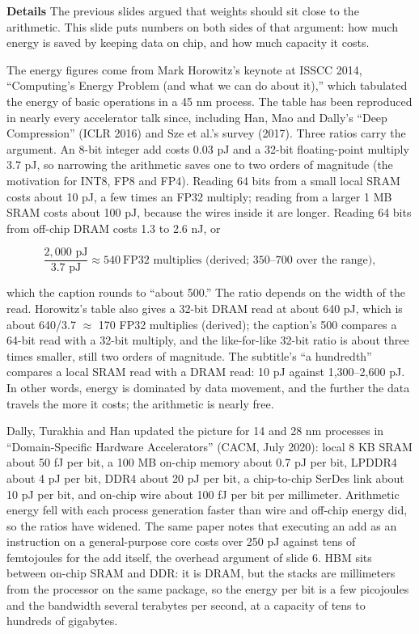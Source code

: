 \documentclass[11pt,letterpaper]{article}
\newcommand{\para}[1]{\medskip\noindent\textbf{#1}\quad}
\newenvironment{formulas}{\begin{tcolorbox}[formulabox]}{\end{tcolorbox}}
\begin{document}
\para{Details} The previous slides argued that weights should sit close to the arithmetic. This slide puts numbers on both sides of that argument: how much energy is saved by keeping data on chip, and how much capacity it costs.

The energy figures come from Mark Horowitz's keynote at ISSCC 2014, ``Computing's Energy Problem (and what we can do about it),'' which tabulated the energy of basic operations in a 45 nm process. The table has been reproduced in nearly every accelerator talk since, including Han, Mao and Dally's ``Deep Compression'' (ICLR 2016) and Sze et al.'s survey (2017). Three ratios carry the argument. An 8-bit integer add costs 0.03 pJ and a 32-bit floating-point multiply 3.7 pJ, so narrowing the arithmetic saves one to two orders of magnitude (the motivation for INT8, FP8 and FP4). Reading 64 bits from a small local SRAM costs about 10 pJ, a few times an FP32 multiply; reading from a larger 1 MB SRAM costs about 100 pJ, because the wires inside it are longer. Reading 64 bits from off-chip DRAM costs 1.3 to 2.6 nJ, or
\begin{formulas}
\[ \frac{2{,}000 \text{ pJ}}{3.7 \text{ pJ}} \approx 540 \ \text{FP32 multiplies (derived; } 350\text{--}700 \text{ over the range)}, \]
\end{formulas}
which the caption rounds to ``about 500.'' The ratio depends on the width of the read. Horowitz's table also gives a 32-bit DRAM read at about 640 pJ, which is about 640/3.7 $\approx$ 170 FP32 multiplies (derived); the caption's 500 compares a 64-bit read with a 32-bit multiply, and the like-for-like 32-bit ratio is about three times smaller, still two orders of magnitude. The subtitle's ``a hundredth'' compares a local SRAM read with a DRAM read: 10 pJ against 1{,}300--2{,}600 pJ. In other words, energy is dominated by data movement, and the further the data travels the more it costs; the arithmetic is nearly free.

Dally, Turakhia and Han updated the picture for 14 and 28 nm processes in ``Domain-Specific Hardware Accelerators'' (CACM, July 2020): local 8 KB SRAM about 50 fJ per bit, a 100 MB on-chip memory about 0.7 pJ per bit, LPDDR4 about 4 pJ per bit, DDR4 about 20 pJ per bit, a chip-to-chip SerDes link about 10 pJ per bit, and on-chip wire about 100 fJ per bit per millimeter. Arithmetic energy fell with each process generation faster than wire and off-chip energy did, so the ratios have widened. The same paper notes that executing an add as an instruction on a general-purpose core costs over 250 pJ against tens of femtojoules for the add itself, the overhead argument of slide 6. HBM sits between on-chip SRAM and DDR: it is DRAM, but the stacks are millimeters from the processor on the same package, so the energy per bit is a few picojoules and the bandwidth several terabytes per second, at a capacity of tens to hundreds of gigabytes.
\end{document}
